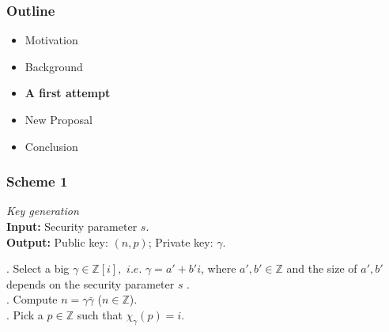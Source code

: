 \documentclass{beamer}
\begin{document}

\begin{frame}
\frametitle{Outline}

 	\begin{itemize}
		\item Motivation 
		\item Background
		\item \textbf{A first attempt}
		\item New Proposal
		\item Conclusion
	\end{itemize}
\end{frame}


\begin{frame}
\frametitle{Scheme 1 \cite{p}}
 	

 	\textit{Key generation} \\

 	\textbf{Input:} Security parameter $s$. \\
 		 \textbf{Output:} Public key: $(n, p)$;  Private key: $\gamma$.
 		 
 		\bigskip
 		 
 			. Select a big $\gamma \in \mathbb{Z}[i],$ $i.e.$ $\gamma = a' + b'i$, where $a', b' \in \mathbb{Z}$ and
 		the size of $a', b'$ depends on the security parameter $s$ . \\
 		 . Compute $n =\gamma \bar{\gamma}$ ($n \in \mathbb{Z}$). \\
 		 . Pick a $p \in \mathbb{Z}$ such that  $ \chi_{\gamma} (p) = i $. \\



\end{frame}

\end{document}
